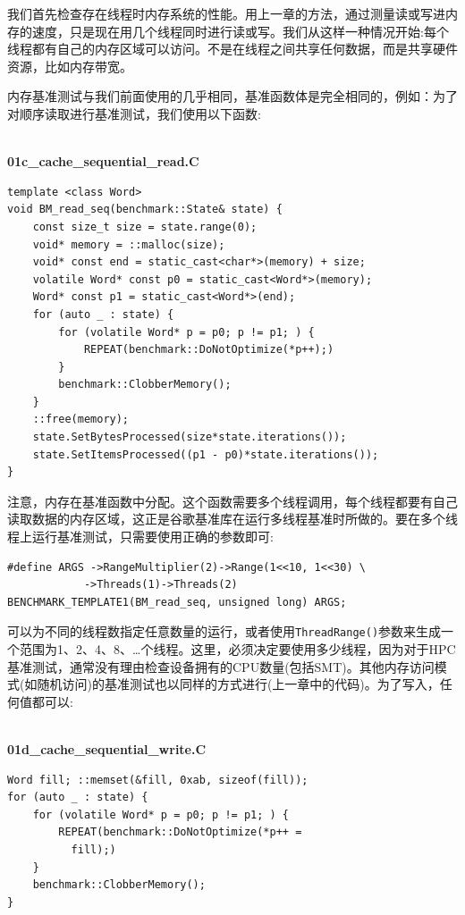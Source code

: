 我们首先检查存在线程时内存系统的性能。用上一章的方法，通过测量读或写进内存的速度，只是现在用几个线程同时进行读或写。我们从这样一种情况开始:每个线程都有自己的内存区域可以访问。不是在线程之间共享任何数据，而是共享硬件资源，比如内存带宽。

内存基准测试与我们前面使用的几乎相同，基准函数体是完全相同的，例如：为了对顺序读取进行基准测试，我们使用以下函数:

\hspace*{\fill} \\ %
\noindent
\textbf{01c\_cache\_sequential\_read.C}
\begin{lstlisting}[style=styleCXX]
template <class Word>
void BM_read_seq(benchmark::State& state) {
	const size_t size = state.range(0);
	void* memory = ::malloc(size);
	void* const end = static_cast<char*>(memory) + size;
	volatile Word* const p0 = static_cast<Word*>(memory);
	Word* const p1 = static_cast<Word*>(end);
	for (auto _ : state) {
		for (volatile Word* p = p0; p != p1; ) {
			REPEAT(benchmark::DoNotOptimize(*p++);)
		}
		benchmark::ClobberMemory();
	}
	::free(memory);
	state.SetBytesProcessed(size*state.iterations());
	state.SetItemsProcessed((p1 - p0)*state.iterations());
}
\end{lstlisting}

注意，内存在基准函数中分配。这个函数需要多个线程调用，每个线程都要有自己读取数据的内存区域，这正是谷歌基准库在运行多线程基准时所做的。要在多个线程上运行基准测试，只需要使用正确的参数即可:

\begin{lstlisting}[style=styleCXX]
#define ARGS ->RangeMultiplier(2)->Range(1<<10, 1<<30) \
			->Threads(1)->Threads(2)
BENCHMARK_TEMPLATE1(BM_read_seq, unsigned long) ARGS;
\end{lstlisting}

可以为不同的线程数指定任意数量的运行，或者使用\texttt{ThreadRange()}参数来生成一个范围为1、2、4、8、…个线程。这里，必须决定要使用多少线程，因为对于HPC基准测试，通常没有理由检查设备拥有的CPU数量(包括SMT)。其他内存访问模式(如随机访问)的基准测试也以同样的方式进行(上一章中的代码)。为了写入，任何值都可以:

\hspace*{\fill} \\ %
\noindent
\textbf{01d\_cache\_sequential\_write.C}
\begin{lstlisting}[style=styleCXX]
Word fill; ::memset(&fill, 0xab, sizeof(fill));
for (auto _ : state) {
	for (volatile Word* p = p0; p != p1; ) {
		REPEAT(benchmark::DoNotOptimize(*p++ =
		  fill);)
	}
	benchmark::ClobberMemory();
}
\end{lstlisting}

